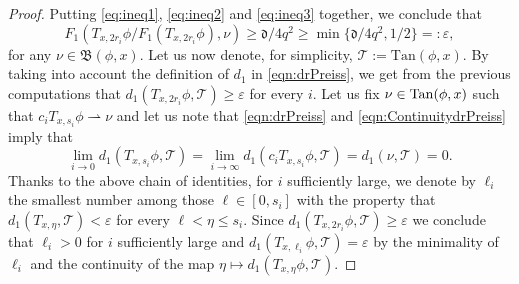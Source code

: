 \documentclass[10pt, a4paper,
oneside, headinclude,footinclude]{scrartcl}
\begin{document}
\begin{proof}
Putting \eqref{eq:ineq1}, \eqref{eq:ineq2} and \eqref{eq:ineq3} together, we conclude that
\begin{equation}
    F_1(T_{x,2r_i}\phi/F_1(T_{x,2r_i}\phi),\nu)\geq \mathfrak{d}/4q^2\geq\min\{\mathfrak{d}/4q^2,1/2\}=:\varepsilon,
    \label{eq:ineq4}
\end{equation}
for any $\nu\in\mathfrak{B}(\phi,x)$. Let us now denote, for simplicity, $\mathscr{T}:=\mathrm{Tan}(\phi,x)$. By taking into account the definition of $d_1$ in \eqref{eqn:drPreiss}, we get from the previous computations that $d_{1}(T_{x,2r_i}\phi,\mathscr{T})\geq \varepsilon$ for every $i$. Let us fix $\nu\in\mathrm{Tan}(\phi,x)$ such that $c_iT_{x,s_i}\phi\rightharpoonup \nu$ and let us note that \eqref{eqn:drPreiss} and \eqref{eqn:ContinuitydrPreiss} imply that $$\lim_{i\to 0}d_1(T_{x,s_i}\phi,\mathscr{T})=\lim_{i\to\infty}d_1(c_iT_{x,s_i}\phi,\mathscr{T})=d_1(\nu,\mathscr{T})=0.$$
Thanks to the above chain of identities, for $i$ sufficiently large, we denote by $\ell_i$ the smallest number among those $\ell\in[0,s_i]$ with the property that $d_1(T_{x,\eta},\mathscr{T})<\varepsilon$ for every $\ell<\eta\leq s_i$.  Since $d_1(T_{x,2r_i}\phi,\mathscr{T})\geq \varepsilon$ we conclude that $\ell_i>0$ for $i$ sufficiently large and $d_1(T_{x,\ell_i}\phi,\mathscr{T})= \varepsilon$ by the minimality of $\ell_i$ and the continuity of the map $\eta\mapsto d_1(T_{x,\eta}\phi,\mathscr{T})$. 


\end{proof}
\end{document}
